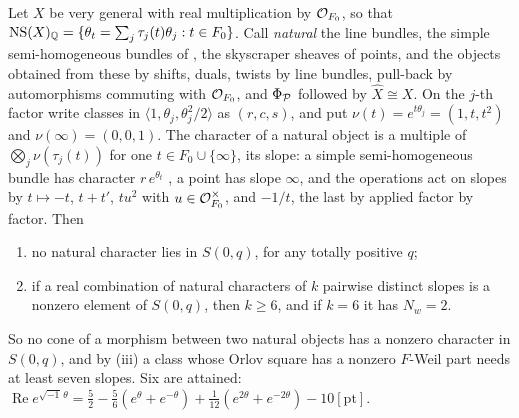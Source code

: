 \begin{remark}\label{rem:sexticnatural}
Let $X$ be very general with real multiplication by $\mathcal{O}_{F_{0}}$, so that
$\mathrm{NS}(X)_{\mathbb{Q}}=\{\theta_{t}=\sum_{j}\tau_{j}(t)\theta_{j}:t\in F_{0}\}$. Call
\emph{natural} the line bundles, the simple semi-homogeneous bundles of
\cite{Muk78}, the skyscraper sheaves of points, and the objects obtained from
these by shifts, duals, twists by line bundles, pull-back by automorphisms
commuting with $\mathcal{O}_{F_{0}}$, and $\Phi_{\mathcal{P}}$ followed by $\widehat X\cong X$.
On the $j$-th factor write classes in $\langle1,\theta_{j},\theta_{j}^{2}/2
\rangle$ as $(r,c,s)$, and put $\nu(t)=e^{t\theta_{j}}=(1,t,t^{2})$ and
$\nu(\infty)=(0,0,1)$. The character of a natural object is a multiple of
$\bigotimes_{j}\nu(\tau_{j}(t))$ for one $t\in F_{0}\cup\{\infty\}$, its
slope: a simple semi-homogeneous bundle has character $r\,e^{\theta_{t}}$
\cite{Muk78}, a point has slope $\infty$, and the operations act on slopes by
$t\mapsto-t$, $t+t'$, $tu^{2}$ with $u\in\mathcal{O}_{F_{0}}^{\times}$, and $-1/t$,
the last by  applied factor by factor. Then
\begin{enumerate}[label=\textup{(\alph*)},leftmargin=2.6em,itemsep=2pt]
\item no natural character lies in $S(0,q)$, for any totally positive $q$;
\item if a real combination of natural characters of $k$ pairwise distinct
  slopes is a nonzero element of $S(0,q)$, then $k\ge6$, and if $k=6$ it has
  $N_{w}=2$.
\end{enumerate}
So no cone of a morphism between two natural objects has a nonzero character
in $S(0,q)$, and by (iii) a class whose Orlov square has
a nonzero $F$-Weil part needs at least seven slopes. Six are attained:
$\operatorname{Re}e^{\sqrt{-1}\,\theta}=\frac52-\frac56(e^{\theta}+e^{-\theta})
+\frac1{12}(e^{2\theta}+e^{-2\theta})-10[\mathrm{pt}]$.


\end{remark}

